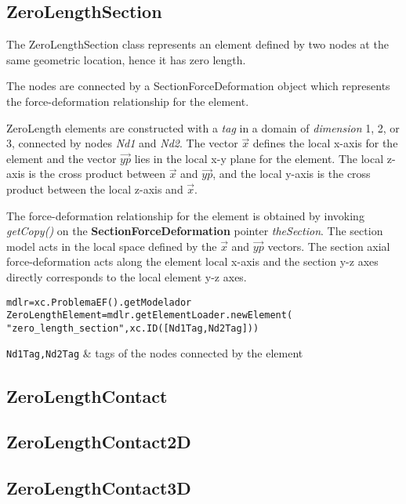 \subsection{ZeroLengthSection}
The ZeroLengthSection class represents an element defined by two nodes at the same geometric location, hence it has zero length.

The nodes are connected by a SectionForceDeformation object which represents the force-deformation relationship for the element. 

ZeroLength elements are constructed with a {\em tag} in a domain of {\em dimension} 1, 2, or 3, connected by nodes {\em Nd1} and {\em Nd2}. 
The vector $\vec{x}$ defines the local x-axis for the element and the vector $\vec{yp}$ lies in the local x-y plane for the element.  The local z-axis is the cross product between $\vec{x}$ and $\vec{yp}$, and the local y-axis is the cross product between the local z-axis and $\vec{x}$.

The force-deformation relationship for the element is obtained by invoking {\em getCopy()} on the {\bf SectionForceDeformation} pointer {\em theSection}. The section model acts in the local space defined by the $\vec{x}$ and $\vec{yp}$ vectors. The section axial force-deformation acts along the element local x-axis and the section y-z axes directly corresponds to the local element y-z axes.

\begin{verbatim}
mdlr=xc.ProblemaEF().getModelador
ZeroLengthElement=mdlr.getElementLoader.newElement(
"zero_length_section",xc.ID([Nd1Tag,Nd2Tag]))
\end{verbatim}
\begin{paramFuncTable}
{\tt Nd1Tag,Nd2Tag} & tags of the nodes connected by the element\\
\end{paramFuncTable}

\begin{paramClassTable}
\ElementParam{}
\ElementZERODParam{}
\end{paramClassTable}

\begin{methodsTable}
\ElementMeth{}
\ElementZERODMeth{}
\ZeroLengthSectionMeth{}
\end{methodsTable}


\subsection{ZeroLengthContact}


\subsection{ZeroLengthContact2D}


\subsection{ZeroLengthContact3D}

